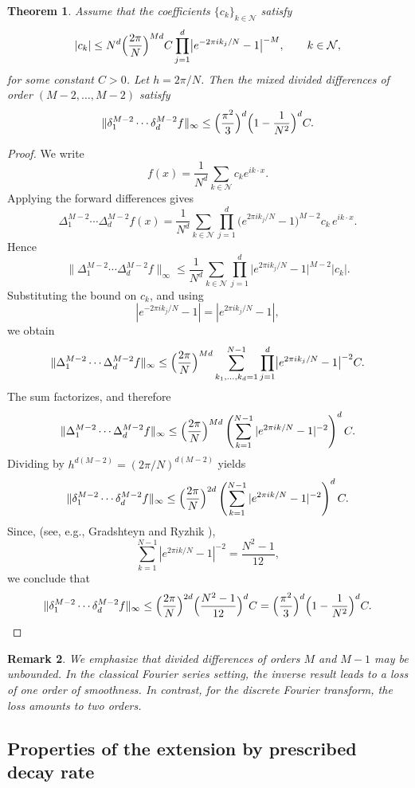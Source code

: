\documentclass[11pt,oneside,reqno]{amsart}
\theoremstyle{plain}
\newtheorem{theorem}{Theorem}[section]
\newtheorem{remark}[theorem]{Remark}
\numberwithin{equation}{section}
\begin{document}
\begin{theorem}
Assume that the coefficients $\{c_k\}_{k\in\mathcal N}$ satisfy
\[
|c_k|
\le
N^d\Bigl(\frac{2\pi}{N}\Bigr)^{Md} C
\prod_{j=1}^d
\bigl|e^{-2\pi i k_j/N}-1\bigr|^{-M},
\qquad k\in\mathcal N,
\]
for some constant $C>0$. Let $h=2\pi/N$. Then the mixed divided
differences of order $(M-2,\dots,M-2)$ satisfy
\[
\|\delta_1^{M-2}\cdots \delta_d^{M-2}f\|_\infty
\le
\Bigl(\frac{\pi^2}{3}\Bigr)^d
\Bigl(1-\frac{1}{N^2}\Bigr)^d C.
\]
\end{theorem}

\begin{proof}
We write
\[
f(x)=\frac{1}{N^d}
\sum_{k\in\mathcal N} c_k e^{ik\cdot x}.
\]
Applying the forward differences gives
\[
\Delta_1^{M-2}\cdots\Delta_d^{M-2}f(x)
=
\frac{1}{N^d}
\sum_{k\in\mathcal N}
\prod_{j=1}^d
\bigl(e^{2\pi i k_j/N}-1\bigr)^{M-2}
c_k\,e^{ik\cdot x}.
\]
Hence
\[
\|\Delta_1^{M-2}\cdots\Delta_d^{M-2}f\|_\infty
\le
\frac{1}{N^d}
\sum_{k\in\mathcal N}
\prod_{j=1}^d
\bigl|e^{2\pi i k_j/N}-1\bigr|^{M-2}
|c_k|.
\]
Substituting the bound on $c_k$, and using
\[
|e^{-2\pi i k_j/N}-1|
=
|e^{2\pi i k_j/N}-1|,
\]
we obtain
\[
\|\Delta_1^{M-2}\cdots\Delta_d^{M-2}f\|_\infty
\le
\Bigl(\frac{2\pi}{N}\Bigr)^{Md}
\sum_{k_1,\dots,k_d=1}^{N-1}
\prod_{j=1}^d
\bigl|e^{2\pi i k_j/N}-1\bigr|^{-2} C.
\]
The sum factorizes, and therefore
\[
\|\Delta_1^{M-2}\cdots\Delta_d^{M-2}f\|_\infty
\le
\Bigl(\frac{2\pi}{N}\Bigr)^{Md}
\left(
\sum_{k=1}^{N-1}
|e^{2\pi i k/N}-1|^{-2}
\right)^d C.
\]
Dividing by $h^{d(M-2)}=(2\pi/N)^{d(M-2)}$ yields
\[
\|\delta_1^{M-2}\cdots \delta_d^{M-2}f\|_\infty
\le
\Bigl(\frac{2\pi}{N}\Bigr)^{2d}
\left(
\sum_{k=1}^{N-1}
|e^{2\pi i k/N}-1|^{-2}
\right)^d C.
\]
Since,  (see, e.g., Gradshteyn and Ryzhik \cite{GR}),
\[
\sum_{k=1}^{N-1}|e^{2\pi i k/N}-1|^{-2}
=
\frac{N^2-1}{12},
\]
we conclude that
\[
\|\delta_1^{M-2}\cdots \delta_d^{M-2}f\|_\infty
\le
\Bigl(\frac{2\pi}{N}\Bigr)^{2d}
\Bigl(\frac{N^2-1}{12}\Bigr)^d C
=
\Bigl(\frac{\pi^2}{3}\Bigr)^d
\Bigl(1-\frac{1}{N^2}\Bigr)^d C.
\]
\end{proof}

\begin{remark}
We emphasize that divided differences  
of orders $M$ and $M-1$  
may be unbounded.  
In the classical Fourier series setting,  
the inverse result leads to  
a loss of one order of smoothness.  
In contrast, for the discrete Fourier transform,  
the loss amounts to two orders.
\end{remark}
\subsection{\bf Properties of the extension by prescribed decay rate}\label{sect1}\hfill
\end{document}

